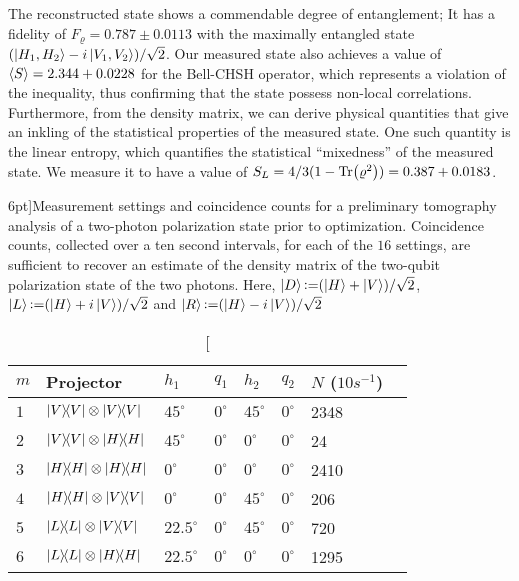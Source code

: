 \noindent
The reconstructed state shows a commendable degree of entanglement; It has a fidelity of $F_{\varrho}=0.787\pm 0.0113$ with the maximally entangled state $(\ket{H_1,H_2} - i\ket{V_1,V_2})/\sqrt{2}$. Our measured state also achieves a value of $\ev{S} = 2.344+0.0228$ for the Bell-\acs{CHSH} operator, which represents a violation of the inequality, thus confirming that the state possess non-local correlations. Furthermore, from the density matrix, we can derive physical quantities that give an inkling of the statistical properties of the measured state. One such quantity is the linear entropy, which quantifies the statistical \enquote{mixedness} of the measured state. We measure it to have a value of $S_L= 4/3(1 - \Tr(\varrho^2)) = 0.387+0.0183$. 

\clearpage

\begin{table}[h]
	\centering
	\caption[Measurement settings and coincidence counts for a preliminary tomography analysis of a two-photon polarization state prior to optimization.][6pt]{Measurement settings and coincidence counts for a preliminary tomography analysis of a two-photon polarization state prior to optimization. Coincidence counts, collected over a ten second intervals, for each of the $16$ settings, are sufficient to recover an estimate of the density matrix of the two-qubit polarization state of the two photons. Here, ${\ket{D}\operatorname{\vcentcolon=}(\ket{H}+\ket{V})/\sqrt{2}}$, ${\ket{L}\operatorname{\vcentcolon=}(\ket{H}+i\ket{V})/\sqrt{2}}$ and ${\ket{R}\operatorname{\vcentcolon=}(\ket{H}-i\ket{V})/\sqrt{2}}$}
	\begin{tabular}{llllllll}
		\toprule
		$m$ & Projector & $h_1$ & $q_1$ & $h_2$ & $q_2$ & $N$ ($10s^{-1}$) \\
		\toprule
		$1$  & $\op{V}\otimes\op{V}$ & $45^{\circ}$   & $0^{\circ}$  & $45^{\circ}$    & $0^{\circ}$   & 2348 \\
		$2$  & $\op{V}\otimes\op{H}$ & $45^{\circ}$   & $0^{\circ}$  & $0^{\circ}$     & $0^{\circ}$   & 24 \\
		$3$  & $\op{H}\otimes\op{H}$ & $0^{\circ}$    & $0^{\circ}$  & $0^{\circ}$     & $0^{\circ}$   & 2410 \\
		$4$  & $\op{H}\otimes\op{V}$ & $0^{\circ}$    & $0^{\circ}$  & $45^{\circ}$    & $0^{\circ}$   & 206 \\
		$5$  & $\op{L}\otimes\op{V}$ & $22.5^{\circ}$ & $0^{\circ}$  & $45^{\circ}$    & $0^{\circ}$   & 720 \\
		$6$  & $\op{L}\otimes\op{H}$ & $22.5^{\circ}$ & $0^{\circ}$  & $0^{\circ}$     & $0^{\circ}$   & 1295 \\

\end{tabular}
\end{table}
